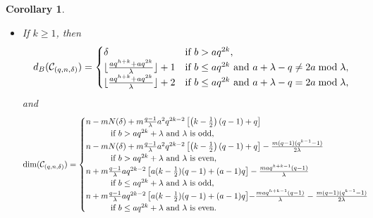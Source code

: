 \documentclass[journal,onecolumn]{IEEEtran}
\newtheorem{Corollary}{Corollary}
\begin{document}
\begin{Corollary}
\begin{itemize}
     \item If $k\geq 1$, then 
\begin{equation}\label{db2}
    d_B(\mathcal{C}_{(q,n,\delta)}) =\begin{cases}
        \delta&\hbox{if } b> aq^{2k},\\
        \lfloor\frac{aq^{h+k}+aq^{2k}}{\lambda}\rfloor+1&\hbox{if }b\leq aq^{2k} \hbox{ and }a+\lambda-q \neq 2a \bmod \lambda,\\
      \lfloor\frac{aq^{h+k}+aq^{2k}}{\lambda}\rfloor+2&\hbox{if }b\leq aq^{2k} \hbox{ and }a+\lambda-q = 2a \bmod \lambda,\\
    \end{cases}
\end{equation}
  and    
\begin{equation}\label{cor5e1}
 \mathrm{dim}(\mathcal{C}_{(q,n,\delta)})=
  \begin{cases}
        n-mN(\delta)+m\frac{q-1}{\lambda}a^2q^{2k-2}\left[\left(k-\frac{1}{2}\right)(q-1)+q\right] \\ 
        \quad \quad \quad \hbox{if }  b> aq^{2k} + \lambda \hbox{ and }\lambda \hbox{ is odd},\\
        n-mN(\delta)+m\frac{q-1}{\lambda}a^2q^{2k-2}\left[\left(k-\frac{1}{2}\right)(q-1)+q\right]-\frac{m(q-1)(q^{k-1}-1)}{2\lambda}\\
        \quad \quad \quad \hbox{if }  b> aq^{2k} + \lambda \hbox{ and }\lambda \hbox{ is even},\\
n+m\frac{q-1}{\lambda}aq^{2k-2}   \left[a(k-\frac{1}{2})(q-1)+(a-1)q\right] -\frac{maq^{h+k-1}(q-1)}{\lambda}
\\
 \quad \quad \quad \hbox{if } b\leq  aq^{2k}+\lambda
   \hbox{ and } \lambda \hbox{ is odd,} \\
\textstyle{n+m\frac{q-1}{\lambda}aq^{2k-2}   \left[a(k-\frac{1}{2})(q-1)+(a-1)q\right]}
\textstyle{-\frac{maq^{h+k-1}(q-1)}{\lambda}-\frac{m(q-1)(q^{k-1}-1)}{2\lambda}}
\\
 \quad \quad \quad\hbox{if } b\leq  aq^{2k}+\lambda
   \hbox{ and } \lambda \hbox{ is even.}   \end{cases}
\end{equation}


 \end{itemize}
\end{Corollary}
\end{document}
